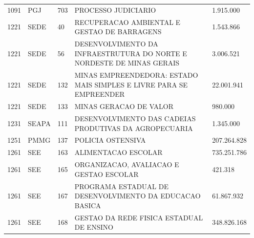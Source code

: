 \documentclass{article}
\begin{document}
\begin{longtable}[c]{m{1cm}|m{1.5cm}|m{1cm}m{10cm}|m{2cm}}
\multicolumn{1}{C{1cm}|}{1091} & \multicolumn{1}{L{1.5cm}|}{PGJ} & \multicolumn{1}{C{1cm}|}{703} & \multicolumn{1}{L{10cm}|}{PROCESSO JUDICIARIO} & \multicolumn{1}{R{2cm}}{1.915.000} \\
\multicolumn{1}{C{1cm}|}{1221} & \multicolumn{1}{L{1.5cm}|}{SEDE} & \multicolumn{1}{C{1cm}|}{40} & \multicolumn{1}{L{10cm}|}{RECUPERACAO AMBIENTAL E GESTAO DE BARRAGENS} & \multicolumn{1}{R{2cm}}{1.543.866} \\
\multicolumn{1}{C{1cm}|}{1221} & \multicolumn{1}{L{1.5cm}|}{SEDE} & \multicolumn{1}{C{1cm}|}{56} & \multicolumn{1}{L{10cm}|}{DESENVOLVIMENTO DA INFRAESTRUTURA DO NORTE E NORDESTE DE MINAS GERAIS} & \multicolumn{1}{R{2cm}}{3.006.521} \\
\multicolumn{1}{C{1cm}|}{1221} & \multicolumn{1}{L{1.5cm}|}{SEDE} & \multicolumn{1}{C{1cm}|}{132} & \multicolumn{1}{L{10cm}|}{MINAS EMPREENDEDORA: ESTADO MAIS SIMPLES E LIVRE PARA SE EMPREENDER} & \multicolumn{1}{R{2cm}}{22.001.941} \\
\multicolumn{1}{C{1cm}|}{1221} & \multicolumn{1}{L{1.5cm}|}{SEDE} & \multicolumn{1}{C{1cm}|}{133} & \multicolumn{1}{L{10cm}|}{MINAS GERACAO DE VALOR} & \multicolumn{1}{R{2cm}}{980.000} \\
\multicolumn{1}{C{1cm}|}{1231} & \multicolumn{1}{L{1.5cm}|}{SEAPA} & \multicolumn{1}{C{1cm}|}{111} & \multicolumn{1}{L{10cm}|}{DESENVOLVIMENTO DAS CADEIAS PRODUTIVAS DA AGROPECUARIA} & \multicolumn{1}{R{2cm}}{1.345.000} \\
\multicolumn{1}{C{1cm}|}{1251} & \multicolumn{1}{L{1.5cm}|}{PMMG} & \multicolumn{1}{C{1cm}|}{137} & \multicolumn{1}{L{10cm}|}{POLICIA OSTENSIVA} & \multicolumn{1}{R{2cm}}{207.264.828} \\
\multicolumn{1}{C{1cm}|}{1261} & \multicolumn{1}{L{1.5cm}|}{SEE} & \multicolumn{1}{C{1cm}|}{163} & \multicolumn{1}{L{10cm}|}{ALIMENTACAO ESCOLAR} & \multicolumn{1}{R{2cm}}{735.251.786} \\
\multicolumn{1}{C{1cm}|}{1261} & \multicolumn{1}{L{1.5cm}|}{SEE} & \multicolumn{1}{C{1cm}|}{165} & \multicolumn{1}{L{10cm}|}{ORGANIZACAO, AVALIACAO E GESTAO ESCOLAR} & \multicolumn{1}{R{2cm}}{421.318} \\
\multicolumn{1}{C{1cm}|}{1261} & \multicolumn{1}{L{1.5cm}|}{SEE} & \multicolumn{1}{C{1cm}|}{167} & \multicolumn{1}{L{10cm}|}{PROGRAMA ESTADUAL DE DESENVOLVIMENTO DA EDUCACAO BASICA} & \multicolumn{1}{R{2cm}}{61.867.932} \\
\multicolumn{1}{C{1cm}|}{1261} & \multicolumn{1}{L{1.5cm}|}{SEE} & \multicolumn{1}{C{1cm}|}{168} & \multicolumn{1}{L{10cm}|}{GESTAO DA REDE FISICA ESTADUAL DE ENSINO} & \multicolumn{1}{R{2cm}}{348.826.168} \\

\end{longtable}
\end{document}
